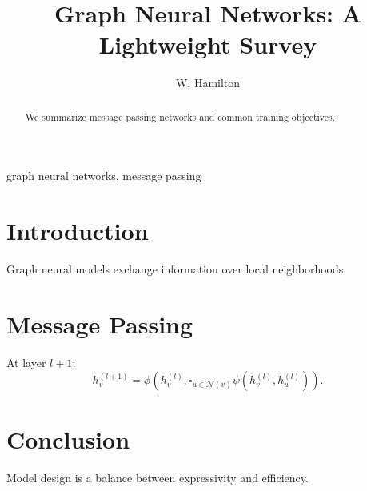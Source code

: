 \documentclass[conference]{IEEEtran}
\affiliation{\institution{Example University}\country{USA}}
\begin{document}
\title{Graph Neural Networks: A Lightweight Survey}
\author{W. Hamilton}
\maketitle
\begin{abstract}
We summarize message passing networks and common training objectives.
\end{abstract}
\begin{IEEEkeywords}
graph neural networks, message passing
\end{IEEEkeywords}
\IEEEoverridecommandlockouts
\section{Introduction}
Graph neural models exchange information over local neighborhoods.

\FloatBarrier
\section{Message Passing}
At layer $l+1$:
\begin{equation}
h_v^{(l+1)}=\phi\left(h_v^{(l)},\square_{u\in\mathcal{N}(v)}\psi(h_v^{(l)},h_u^{(l)})\right).
\end{equation}

\FloatBarrier
\section{Conclusion}
Model design is a balance between expressivity and efficiency.

\FloatBarrier


\end{document}
